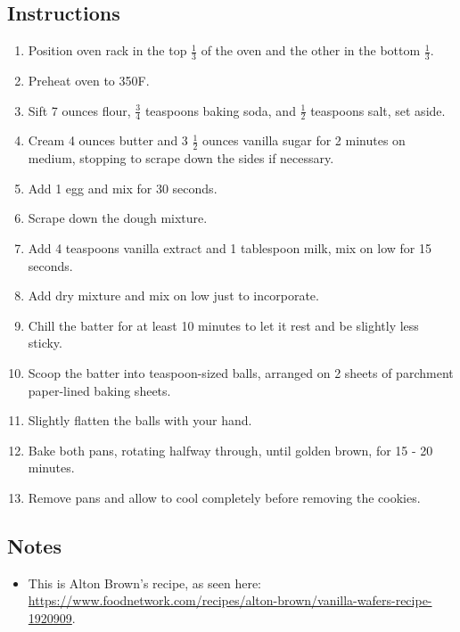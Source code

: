 \begin{multicols}{2}
\subsection*{Instructions}
\begin{enumerate}
    \item Position oven rack in the top \( \frac{1}{3} \) of the oven and the other in the bottom \( \frac{1}{3} \).
    \item Preheat oven to 350F.
    \item Sift 7 ounces flour, \( \frac{3}{4} \) teaspoons baking soda, and \( \frac{1}{2} \) teaspoons salt, set aside.
    \item Cream 4 ounces butter and 3 \( \frac{1}{2} \) ounces vanilla sugar for 2 minutes on medium, stopping to scrape down the sides if necessary.
    \item Add 1 egg and mix for 30 seconds.
    \item Scrape down the dough mixture.
    \item Add 4 teaspoons vanilla extract and 1 tablespoon milk, mix on low for 15 seconds.
    \item Add dry mixture and mix on low just to incorporate.
    \item Chill the batter for at least 10 minutes to let it rest and be slightly less sticky.
    \item Scoop the batter into teaspoon-sized balls, arranged on 2 sheets of parchment paper-lined baking sheets.
    \item Slightly flatten the balls with your hand.
    \item Bake both pans, rotating halfway through, until golden brown, for 15 - 20 minutes.
    \item Remove pans and allow to cool completely before removing the cookies.
\end{enumerate}

\subsection*{Notes}
\begin{itemize}
    \item This is Alton Brown’s recipe, as seen here: \url{https://www.foodnetwork.com/recipes/alton-brown/vanilla-wafers-recipe-1920909}.
\end{itemize}
\end{multicols}
\clearpage